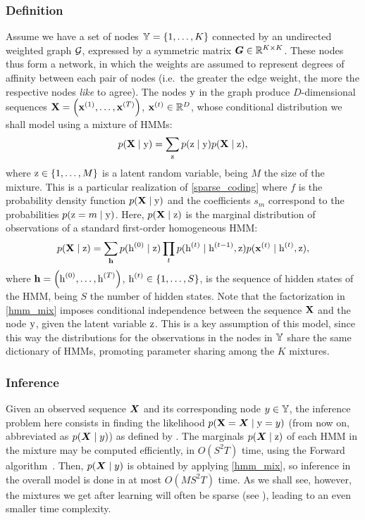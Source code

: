 \subsubsection{Definition}
\label{sec:definition}
Assume we have a set of nodes ${\mathbb{Y}}=\{1, \dots, K\}$ connected by an undirected weighted graph ${\mathcal{G}}$, expressed by a symmetric matrix ${\bm{G}} \in \mathbb{R}^{K \times K}$. These nodes thus form a network, in which the weights are assumed to represent degrees of affinity between each pair of nodes (i.e.\ the greater the edge weight, the more the respective nodes \textit{like} to agree). The nodes ${\textnormal{y}}$ in the graph produce $D$-dimensional sequences ${\mathbf{X}} = \left({\mathbf{x}}^{(1)}, \dots,{\mathbf{x}}^{(T)} \right)$, ${\mathbf{x}}^{(t)} \in \mathbb{R}^D$, whose conditional distribution we shall model using a mixture of HMMs:
\begin{equation}
\label{hmm_mix}
p({\mathbf{X}} \mid {\textnormal{y}}) = \sum_{{\textnormal{z}}} p({\textnormal{z}}\mid{\textnormal{y}}) p({\mathbf{X}} \mid {\textnormal{z}}),
\end{equation}
where ${\textnormal{z}} \in \{1, \dots, M\}$ is a latent random variable, being $M$ the size of the mixture. This is a particular realization of \eqref{sparse_coding} where $f$ is the probability density function $p({\mathbf{X}} \mid {\textnormal{y}})$ and the coefficients $s_m$ correspond to the probabilities $p({\textnormal{z}} = m \mid {\textnormal{y}})$. Here, $p({\mathbf{X}} \mid {\textnormal{z}})$ is the marginal distribution of observations of a standard first-order homogeneous HMM:
\begin{equation}
\label{hmm}
p({\mathbf{X}} \mid {\textnormal{z}}) = \sum_{{\mathbf{h}}} p({\textnormal{h}}^{(0)}\mid{\textnormal{z}}) \prod_t p({\textnormal{h}}^{(t)}\mid{\textnormal{h}}^{(t-1)},{\textnormal{z}}) p({\mathbf{x}}^{(t)}\mid{\textnormal{h}}^{(t)},{\textnormal{z}}),
\end{equation}
where ${\mathbf{h}} = \left({\textnormal{h}}^{(0)}, \dots,{\textnormal{h}}^{(T)} \right)$, ${\textnormal{h}}^{(t)} \in \{1, \dots, S\}$, is the sequence of hidden states of the HMM, being $S$ the number of hidden states. Note that the factorization in \eqref{hmm_mix} imposes conditional independence between the sequence ${\mathbf{X}}$ and the node ${\textnormal{y}}$, given the latent variable ${\textnormal{z}}$. This is a key assumption of this model, since this way the distributions for the observations in the nodes in ${\mathbb{Y}}$ share the same dictionary of HMMs, promoting parameter sharing among the $K$ mixtures.

\subsubsection{Inference}
\label{sec:inference}
Given an observed sequence ${\bm{X}}$ and its corresponding node $y \in {\mathbb{Y}}$, the inference problem here consists in finding the likelihood $p({\mathbf{X}}={\bm{X}} \mid {\textnormal{y}}=y)$ (from now on, abbreviated as $p({\bm{X}} \mid y)$) as defined by  . The marginals $p({\bm{X}}\mid{\textnormal{z}})$ of each HMM in the mixture may be computed efficiently, in $O(S^2T)$ time, using the Forward algorithm~\citet{Rabiner1986}. Then, $p({\bm{X}} \mid y)$ is obtained by applying \eqref{hmm_mix}, so inference in the overall model is done in at most $O(MS^2T)$ time. As we shall see, however, the mixtures we get after learning will often be sparse (see ), leading to an even smaller time complexity.

